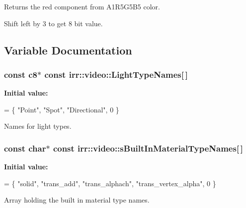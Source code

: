 Returns the red component from A1\+R5\+G5\+B5 color. 

Shift left by 3 to get 8 bit value. 

\subsection{Variable Documentation}
\subsubsection[{\texorpdfstring{Light\+Type\+Names}{LightTypeNames}}]{\setlength{\rightskip}{0pt plus 5cm}const {\bf c8}$\ast$ const irr\+::video\+::\+Light\+Type\+Names\mbox{[}$\,$\mbox{]}}\hypertarget{namespaceirr_1_1video_a345c3fd9c805bbe508a49fa367846bc8}{}\label{namespaceirr_1_1video_a345c3fd9c805bbe508a49fa367846bc8}
{\bfseries Initial value\+:}
\begin{DoxyCode}
=
\{
    \textcolor{stringliteral}{"Point"},
    \textcolor{stringliteral}{"Spot"},
    \textcolor{stringliteral}{"Directional"},
    0
\}
\end{DoxyCode}


Names for light types. 

\subsubsection[{\texorpdfstring{s\+Built\+In\+Material\+Type\+Names}{sBuiltInMaterialTypeNames}}]{\setlength{\rightskip}{0pt plus 5cm}const char$\ast$ const irr\+::video\+::s\+Built\+In\+Material\+Type\+Names\mbox{[}$\,$\mbox{]}}\hypertarget{namespaceirr_1_1video_a833460ba01098710b6df3ec5c281c873}{}\label{namespaceirr_1_1video_a833460ba01098710b6df3ec5c281c873}
{\bfseries Initial value\+:}
\begin{DoxyCode}
=
    \{
        \textcolor{stringliteral}{"solid"},
        \textcolor{stringliteral}{"trans\_add"},
        \textcolor{stringliteral}{"trans\_alphach"},
        \textcolor{stringliteral}{"trans\_vertex\_alpha"},
        0
    \}
\end{DoxyCode}


Array holding the built in material type names. 

